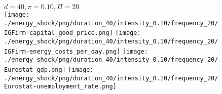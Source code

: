 \begin{figure}[ht!]
\centering\leavevmode
\begin{minipage}{17cm}
\centering\leavevmode
{$d=40, \pi=0.10, \Pi=20$}\\
\texttt{[image: ./energy\_shock/png/duration\_40/intensity\_0.10/frequency\_20/IGFirm-capital\_good\_price.png]}
\texttt{[image: ./energy\_shock/png/duration\_40/intensity\_0.10/frequency\_20/IGFirm-energy\_costs\_per\_day.png]}
\texttt{[image: ./energy\_shock/png/duration\_40/intensity\_0.10/frequency\_20/Eurostat-gdp.png]}
\texttt{[image: ./energy\_shock/png/duration\_40/intensity\_0.10/frequency\_20/Eurostat-unemployment\_rate.png]}
\end{minipage}
\end{figure}

